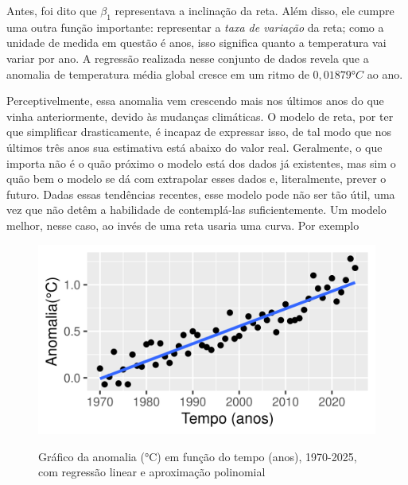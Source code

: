 Antes, foi dito que $\beta_1$ representava a inclinação da reta.
Além disso, ele cumpre uma outra função importante: representar a \textit{taxa de variação} da reta; como a unidade de medida em questão é anos, isso significa quanto a temperatura vai variar por ano.
A regressão realizada nesse conjunto de dados revela que a anomalia de temperatura média global cresce em um ritmo de $0,01879 °C$ ao ano.

Perceptivelmente, essa anomalia vem crescendo mais nos últimos anos do que vinha anteriormente, devido às mudanças climáticas.
O modelo de reta, por ter que simplificar drasticamente, é incapaz de expressar isso, de tal modo que nos últimos três anos sua estimativa está abaixo do valor real.
Geralmente, o que importa não é o quão próximo o modelo está dos dados já existentes, mas sim o quão bem o modelo se dá com extrapolar esses dados e, literalmente, prever o futuro.
Dadas essas tendências recentes, esse modelo pode não ser tão útil, uma vez que não detêm a habilidade de contemplá-las suficientemente.
Um modelo melhor, nesse caso, ao invés de uma reta usaria uma curva.
Por exemplo

\begin{figure}[H]
    \centering
    \caption{Gráfico da anomalia (°C) em função do tempo (anos), 1970-2025, com regressão linear e aproximação polinomial}
    \includegraphics[width=\linewidth]{static/R/plot/anom-5-scatter+reg+poly.png}
    \label{fig:2:anom-3-scatter+reg+poly}
\end{figure}
